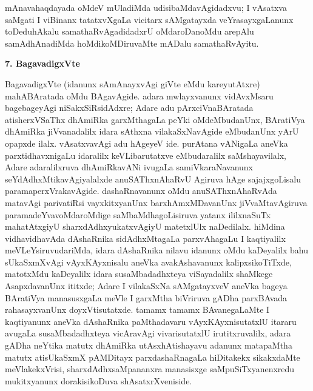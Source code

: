 mAnavahaqdayada oMdeV mUladiMda udisi\-baMdavAgidadxvu; I vAsatxva saMgati I viBinanx tatatxvXgaLa vicitarx sAMgatayxda veYrasayx\-gaLanunx toDeduhAkalu samathaRvAgadidadxrU oMdaroDanoMdu arepAlu samAdhAnadiMda hoMdikoMDiruvaMte mADalu samathaRvAyitu.

\smallskip
\begin{center}
{\Large\bf 7. BagavadigxVte}
\end{center}

BagavadigxVte (idanunx sAmAnayxvAgi giVte eMdu kareyutAtxre) mahABAratada oMdu BAgavAgide. adara mwlayxvanunx vidAvxMsaru bagebageyAgi niSakxSiRsidAdxre; Adare adu pArxciVnaBAratada atisherxVSaThx dhAmiRka garxMthagaLa peYki oMdeMbudanUnx, BAratiVya dhAmiRka jiVvanadalilx idara sAthxna vilakaSxNavAgide eMbudanUnx yArU opapxde ilalx. vAsatxvavAgi adu hAgeyeV ide. purAtana vANigaLa aneVka parxtidhavxni\-gaLu idaralilx keVLibarutatxve eMbudaralilx saMshayavilalx, Adare adaralilxruva dhAmiRka\-vANi ivugaLa samiVkaraNavanunx seYdAdhxMtikavAgiyalalxde anuSAThxnAhaRvU Agiruva hAge sajajxgoLisalu paramaperxVrakavAgide. dashaRnavanunx oMdu anuSAThxnAhaRvAda matavAgi parivatiRsi vayxkitxyanUnx barxhAmxMDavanUnx jiVvaMtavAgiruva paramadeYva\-voMdaroMdige saMbaMdhagoLisiruva yatanx ililxnaSuTx mahatAtxgiyU sharxdAdhxyukatx\-vAgiyU matetxlUlx naDedilalx. hiMdina vidhavidhavAda dAshaRnika sidAdhxMtagaLa parxvAhagaLu I kaqtiyalilx meVLeYsiruvudariMda, idara dAshaRnika nilavu idanunx oMdu kaDeyalilx bahu sUkaSxmXvAgi vAyxKAyxnisalu aneVka avakAshavanunx kalipxsikoTiTxde, matotxMdu kaDeyalilx idara susaMbadadhxteya viSayadalilx shaMkege AsapxdavanUnx ititxde; Adare I vilakaSxNa sAMgatayxveV aneVka bageya BAratiVya manasusxgaLa meVle I garxMtha biVriruva gADha parxBAvada rahasayxvanUnx doyxVtisutatxde. tamamx tamamx BAvanegaLaMte I kaqtiyanunx aneVka dAshaRnika paMthadavaru vAyxKAyxnisutatxlU itararu avugaLa susaMbadadhxteya vicAravAgi vivarisutatxlU irutitxruvalilx, adara gADha neYtika matutx dhAmiRka utAsxhAtishayavu adanunx matapaMtha matutx atisUkaSxmX pAMDitayx parxdashaRnagaLa hiDitakekx sikakxdaMte meVlakekxVrisi, sharxdAdhxsaMpananxra manasisxge saMpuSiTxyanenxredu mukitxyanunx dorakisikoDuva shAsatxrXveniside.

